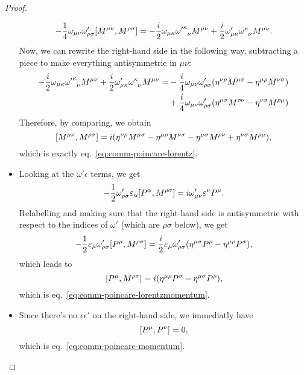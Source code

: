\begin{proof}
\begin{itemize}
    \begin{align*}
       - \frac{1}{4} \omega_{\mu\nu} \omega'_{\rho\sigma} \comm{M^{\mu\nu}}{M^{\rho\sigma}} = -\frac{i}{2} \omega_{\mu\kappa} \tensor{{\omega'}}{^\kappa_\nu} M^{\mu\nu} + \frac{i}{2} \omega'_{\mu\kappa} \tensor{\omega}{^\kappa_\nu} M^{\mu\nu} .
    \end{align*}
    Now, we can rewrite the right-hand side in the following way, subtracting a piece to make everything antisymmetric in $\mu\nu$:
    \begin{align*}
        -\frac{i}{2} \omega_{\mu\kappa} \tensor{{\omega'}}{^\kappa_\nu} M^{\mu\nu} + \frac{i}{2} \omega'_{\mu\kappa} \tensor{\omega}{^\kappa_\nu} M^{\mu\nu} = &-\frac{i}{4} \omega_{\mu\nu} \omega'_{\rho\sigma}( \eta^{\nu\rho}M^{\mu\sigma} - \eta^{\mu\rho}M^{\nu\sigma} ) \\
        &+ \frac{i}{4} \omega_{\mu\nu}\omega'_{\rho\sigma} ( \eta^{\mu\sigma}M^{\rho\nu} -\eta^{\nu\sigma}M^{\rho\mu})
    \end{align*}
    Therefore, by comparing, we obtain
    \begin{equation*}
        \comm{M^{\mu\nu}}{M^{\rho\sigma}} = i ( \eta^{\nu\rho}M^{\mu\sigma} - \eta^{\mu\rho}M^{\nu\sigma} - \eta^{\mu\sigma}M^{\rho\nu} + \eta^{\nu\sigma}M^{\rho\mu}),
    \end{equation*}
    which is exactly eq.~\eqref{eq:comm-poincare-lorentz}.
    \item Looking at the $\omega' \epsilon$ terms, we get
    \begin{equation*}
         - \frac{1}{2} \omega'_{\rho\sigma} \epsilon_\alpha \comm{P^\alpha}{M^{\rho\sigma}} = i \omega'_{\mu\nu} \epsilon^\nu P^\mu .
    \end{equation*}
    Relabelling and making sure that the right-hand side is antisymmetric with respect to the indices of $\omega'$ (which are $\rho\sigma$ below), we get
    \begin{equation*}
        -\frac{1}{2} \epsilon_{\mu} \omega'_{\rho\sigma}\comm{P^\mu}{M^{\rho\sigma}} = \frac{i}{2} \epsilon_\mu \omega'_{\rho\sigma}  ( \eta^{\mu\sigma} P^\rho - \eta^{\mu\rho}P^{\sigma} ) ,
    \end{equation*}
    which leads to
    \begin{equation*}
        \comm{P^\mu}{M^{\rho\sigma}} = i (\eta^{\mu\rho} P^\sigma - \eta^{\mu\sigma} P^\rho),
    \end{equation*}
    which is eq.~\eqref{eq:comm-poincare-lorentzmomentum}.
    \item Since there's no $\epsilon \epsilon'$ on the right-hand side, we immediatly have
    \begin{equation*}
        \comm{P^\mu}{P^\nu} = 0,
    \end{equation*}
    which is eq.~\eqref{eq:comm-poincare-momentum}.
\end{itemize}
\end{proof}


